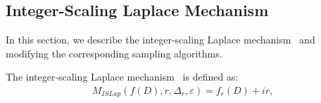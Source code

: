 


\subsection{Integer-Scaling Laplace Mechanism}
\label{subsec:ISLap}
In this section, we describe the integer-scaling Laplace mechanism~\cite{googleDP2019} and modifying the corresponding sampling algorithms.

The integer-scaling Laplace mechanism~\cite{googleDP2019} is defined as:
\begin{equation}
    \begin{split}
        M_{ISLap}\left(f\left(D\right),r,\Delta _r,\varepsilon\right)=f_r\left(D\right) +ir,
    \end{split}
\end{equation}

